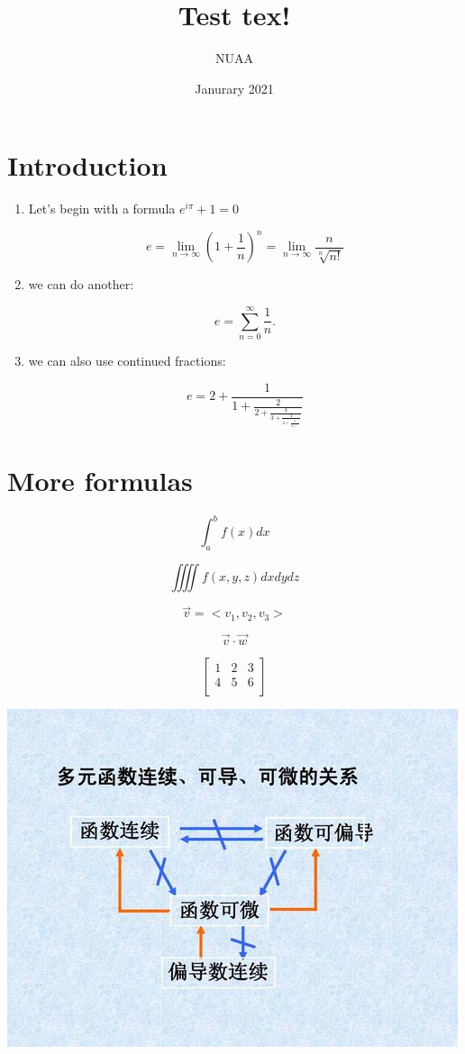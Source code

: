 \documentclass{article}
\title{Test tex!}
\author{NUAA}
\date{Janurary 2021}
\begin{document}
	
\maketitle

\section*{Introduction}

\begin{enumerate}

\item Let's begin with a formula $e^{i\pi}+1=0$

$$e = \lim_{n\to\infty} \left(1+\frac{1}{n}\right)^n=
\lim_{n\to\infty}\frac{n}{\sqrt[n]{n!}}$$

\item we can do another:

$$ e = \sum_{n=0}^{\infty} \frac{1}{n}.$$

\item we can also use continued fractions:

$$ e = 2 + \frac{1}{1+\frac{2}{2+\frac{3}{3+\frac{4}{4+\frac{5}{5+\ddots}}}}} $$
 
\end{enumerate}

\section*{More formulas}

$$\int_a^b{f(x)}dx$$

$$\iiiint f(x,y,z)dxdydz$$

$$\vec{v}=<v_1,v_2,v_3>$$

$$\vec{v}\cdot \vec{w}$$

$$\left[\begin{matrix}
1 & 2 & 3\\
4 & 5 & 6\\	
\end{matrix}\right]
$$

\begin{center}
	\includegraphics[scale = 0.5]{function.jpg}
\end{center}
\end{document}
